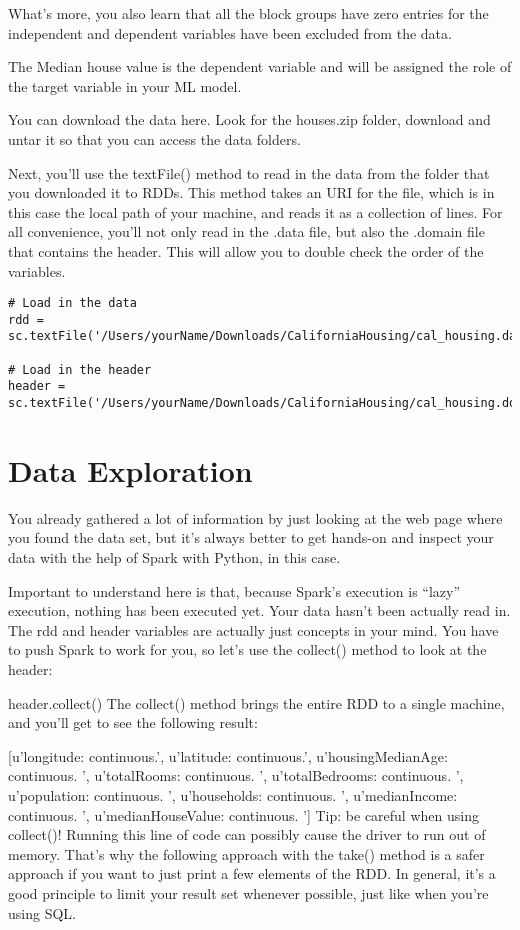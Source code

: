 \documentclass[a4paper,12pt]{article}
\begin{document}
What’s more, you also learn that all the block groups have zero entries for the independent and dependent variables have been excluded from the data.

The Median house value is the dependent variable and will be assigned the role of the target variable in your ML model.

You can download the data here. Look for the houses.zip folder, download and untar it so that you can access the data folders.

Next, you’ll use the textFile() method to read in the data from the folder that you downloaded it to RDDs. This method takes an URI for the file, which is in this case the local path of your machine, and reads it as a collection of lines. For all convenience, you’ll not only read in the .data file, but also the .domain file that contains the header. This will allow you to double check the order of the variables.

\begin{verbatim}
# Load in the data
rdd = sc.textFile('/Users/yourName/Downloads/CaliforniaHousing/cal_housing.data')

# Load in the header
header = sc.textFile('/Users/yourName/Downloads/CaliforniaHousing/cal_housing.domain')
\end{verbatim}

\section*{Data Exploration}
You already gathered a lot of information by just looking at the web page where you found the data set, but it’s always better to get hands-on and inspect your data with the help of Spark with Python, in this case.

Important to understand here is that, because Spark’s execution is “lazy” execution, nothing has been executed yet. Your data hasn’t been actually read in. The rdd and header variables are actually just concepts in your mind. You have to push Spark to work for you, so let’s use the collect() method to look at the header:

header.collect()
The collect() method brings the entire RDD to a single machine, and you’ll get to see the following result:

[u'longitude: continuous.', u'latitude: continuous.', u'housingMedianAge: continuous. ', u'totalRooms: continuous. ', u'totalBedrooms: continuous. ', u'population: continuous. ', u'households: continuous. ', u'medianIncome: continuous. ', u'medianHouseValue: continuous. ']
Tip: be careful when using collect()! Running this line of code can possibly cause the driver to run out of memory. That’s why the following approach with the take() method is a safer approach if you want to just print a few elements of the RDD. In general, it’s a good principle to limit your result set whenever possible, just like when you’re using SQL.
\end{document}
